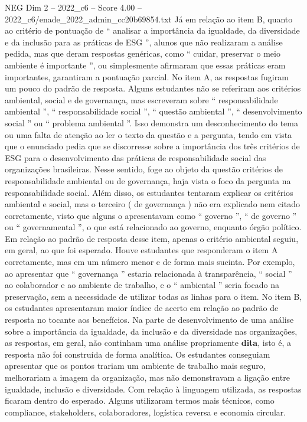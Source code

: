 \begin{textsample}{NEG Dim 2 – 2022\_c6 – Score 4.00 – 2022\_c6/enade\_2022\_admin\_cc20b69854.txt}
Já em relação ao item B, quanto ao critério de pontuação de “ analisar a importância da igualdade, da diversidade e da inclusão para as práticas de ESG ”, alunos que não realizaram a análise pedida, mas que deram respostas genéricas, como “ cuidar, preservar o meio ambiente é importante ”, ou simplesmente afirmaram que essas práticas eram importantes, garantiram a pontuação parcial.
No item A, as respostas fugiram um pouco do padrão de resposta.
Alguns estudantes não se referiram aos critérios ambiental, social e de governança, mas escreveram sobre “ responsabilidade ambiental ”, “ responsabilidade social ”, “ questão ambiental ”, “ desenvolvimento social ” ou “ problema ambiental ”.
Isso demonstra um desconhecimento do tema ou uma falta de atenção ao ler o texto da questão e a pergunta, tendo em vista que o enunciado pedia que se discorresse sobre a importância dos três critérios de ESG para o desenvolvimento das práticas de responsabilidade social das organizações brasileiras.
Nesse sentido, foge ao objeto da questão critérios de responsabilidade ambiental ou de governança, haja vista o foco da pergunta na responsabilidade social.
Além disso, os estudantes tentaram explicar os critérios ambiental e social, mas o terceiro ( de governança ) não era explicado nem citado corretamente, visto que alguns o apresentavam como “ governo ”, “ de governo ” ou “ governamental ”, o que está relacionado ao governo, enquanto órgão político.
Em relação ao padrão de resposta desse item, apenas o critério ambiental seguiu, em geral, ao que foi esperado.
Houve estudantes que responderam o item A corretamente, mas em um número menor e de forma mais sucinta.
Por exemplo, ao apresentar que “ governança ” estaria relacionada à transparência, “ social ” ao colaborador e ao ambiente de trabalho, e o “ ambiental ” seria focado na preservação, sem a necessidade de utilizar todas as linhas para o item.
No item B, os estudantes apresentaram maior índice de acerto em relação ao padrão de resposta no tocante aos benefícios.
Na parte de desenvolvimento de uma análise sobre a importância da igualdade, da inclusão e da diversidade nas organizações, as respostas, em geral, não continham uma análise propriamente \textbf{dita}, isto é, a resposta não foi construída de forma analítica.
Os estudantes conseguiam apresentar que os pontos trariam um ambiente de trabalho mais seguro, melhorariam a imagem da organização, mas não demonstravam a ligação entre igualdade, inclusão e diversidade.
Com relação à linguagem utilizada, as respostas ficaram dentro do esperado.
Alguns utilizaram termos mais técnicos, como compliance, stakeholders, colaboradores, logística reversa e economia circular.

\end{textsample}
